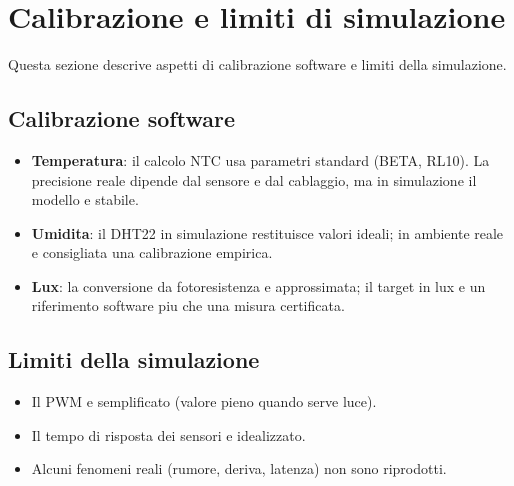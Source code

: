 \chapter{Calibrazione e limiti di simulazione}

Questa sezione descrive aspetti di calibrazione software e limiti della simulazione.

\section{Calibrazione software}
\begin{itemize}
  \item \textbf{Temperatura}: il calcolo NTC usa parametri standard (BETA, RL10). La precisione reale dipende dal sensore e dal cablaggio, ma in simulazione il modello e stabile.
  \item \textbf{Umidita}: il DHT22 in simulazione restituisce valori ideali; in ambiente reale e consigliata una calibrazione empirica.
  \item \textbf{Lux}: la conversione da fotoresistenza e approssimata; il target in lux e un riferimento software piu che una misura certificata.
\end{itemize}

\section{Limiti della simulazione}
\begin{itemize}
  \item Il PWM e semplificato (valore pieno quando serve luce).
  \item Il tempo di risposta dei sensori e idealizzato.
  \item Alcuni fenomeni reali (rumore, deriva, latenza) non sono riprodotti.
\end{itemize}

